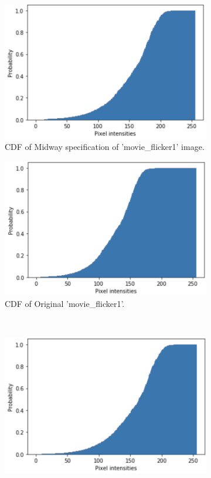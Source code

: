 \begin{figure}[H]
	\centering
	\begin{subfigure}[b]{0.45\textwidth}
		\centering
		\includegraphics[width=\textwidth]{Materials/cdfms1}
		\caption{CDF of Midway specification of 'movie\_flicker1' image.}
	\end{subfigure}
	\hfill
	\begin{subfigure}[b]{0.45\textwidth}
		\centering
		\includegraphics[width=\textwidth]{Materials/cdfmf1}
		\caption{CDF of Original 'movie\_flicker1'.\\\hfill}
	\end{subfigure}
	\hfill
	\\
	\begin{subfigure}[b]{0.45\textwidth}
		\centering
		\includegraphics[width=\textwidth]{Materials/cdfms2}

\end{subfigure}
\end{figure}
